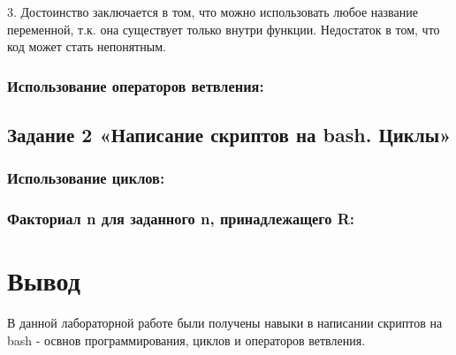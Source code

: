 3. Достоинство заключается в том, что можно использовать любое название переменной, т.к. она существует только внутри функции. Недостаток в том, что код может стать непонятным.

\subsubsection{Использование операторов ветвления:}
	
	\parindent=1cm

\newpage

\subsection{Задание 2 «Написание скриптов на bash. Циклы»}
\subsubsection{Использование циклов:}
	
	\parindent=1cm

\subsubsection{Факториал n для заданного n, принадлежащего R:}
	
	\parindent=1cm

\section{Вывод}
В данной лабораторной работе были получены навыки в написании скриптов на bash - освнов программирования, циклов и операторов ветвления. 


